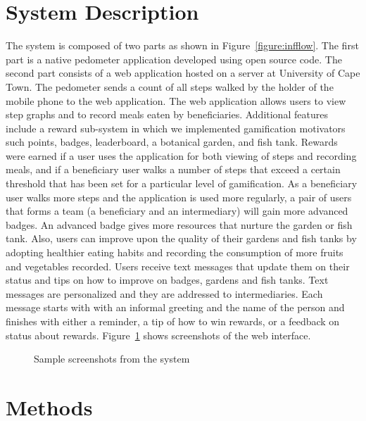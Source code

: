 \documentclass{sig-alternate}
\begin{document}
\section{System Description}

The system is composed of two parts as shown in Figure~\ref{figure:infflow}. The
first part is a  native pedometer application developed using open source
code. The second part consists of a web application hosted on a server at
University of Cape Town. The pedometer sends a count of all steps walked by
the holder of the mobile phone to the web
application. The web application allows users to view step graphs and 
to record meals eaten by beneficiaries. Additional features include a reward
sub-system in which we implemented gamification motivators such points, badges,
leaderboard, a botanical garden, and fish tank. Rewards were earned if a user
uses the application for both viewing of steps and  recording meals, and if a
beneficiary user walks a number of steps that exceed a certain threshold that
has been set for a particular level of gamification. As a beneficiary user
walks more steps and the application is used more regularly, a pair of users
that forms a team (a beneficiary and an intermediary) will gain
more advanced badges. An advanced badge gives more resources that nurture the
garden or fish tank. Also, users can improve upon the quality of their gardens
and fish tanks by adopting healthier eating habits and recording the 
consumption of
 more fruits and vegetables recorded.
Users receive text messages that
update them on their status and tips on how to improve on badges, gardens and
fish tanks. Text messages are personalized and they are addressed to
intermediaries. Each message starts with with an informal greeting and the
name of the person and finishes with either a reminder, a tip of how to win
rewards, or a feedback on status about rewards. Figure~\ref{figure:screens}
shows screenshots of the web interface.

 \begin{figure*}
\centering
{}
\caption{Information flow inside the system}
\label{figure:infflow}
\end{figure*}
\begin{figure}
\centering
{}
\caption{Sample screenshots from the system}
\label{figure:screens}
\end{figure}

\section{Methods}
\end{document}
